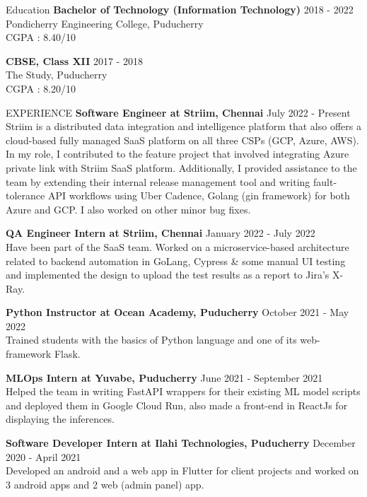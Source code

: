 \documentclass{template}
\begin{document}
\begin{rSection}{Education}
{\bf Bachelor of Technology (Information Technology)} \hfill {2018 - 2022}
\\ 
Pondicherry Engineering College, Puducherry \\
CGPA : 8.40/10

{\textbf{CBSE, Class XII}} \hfill 2017 - 2018\\
The Study, Puducherry \\
CGPA : 8.20/10

\end{rSection}

\begin{rSection}{EXPERIENCE}
\textbf{Software Engineer at Striim, Chennai} \hfill July 2022 - Present \\
Striim is a distributed data integration and intelligence platform that also offers a cloud-based fully managed SaaS platform on all three CSPs (GCP, Azure, AWS). In my role, I  contributed to the feature project that involved integrating Azure private link with Striim SaaS platform. Additionally, I provided assistance to the team by extending their internal release management tool and writing fault-tolerance API workflows using Uber Cadence, Golang (gin framework) for both Azure and GCP. I also worked on other minor bug fixes.

\textbf{QA Engineer Intern at Striim, Chennai} \hfill January 2022 - July 2022 \\
Have been part of the SaaS team. Worked on a microservice-based architecture related to backend automation in GoLang, Cypress \& some manual UI testing and implemented the design to upload the test results as a report to Jira's X-Ray.

\textbf{Python Instructor at Ocean Academy, Puducherry} \hfill October 2021 - May 2022 \\
Trained students with the basics of Python language and one of its web-framework Flask.

\textbf{MLOps Intern at Yuvabe, Puducherry} \hfill June 2021 - September 2021 \\
Helped the team in writing FastAPI wrappers for their existing ML model scripts and deployed them in Google Cloud Run, also made a front-end in ReactJs for displaying the inferences.

\textbf{Software Developer Intern at Ilahi Technologies, Puducherry} \hfill December 2020 - April 2021 \\
Developed an android and a web app in Flutter for client projects and worked on 3 android apps and 2 web (admin panel) app.

\end{rSection} 
\end{document}
